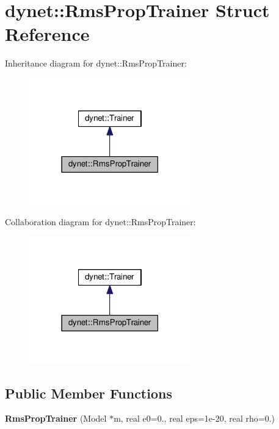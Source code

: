 \hypertarget{structdynet_1_1RmsPropTrainer}{}\section{dynet\+:\+:Rms\+Prop\+Trainer Struct Reference}
\label{structdynet_1_1RmsPropTrainer}


Inheritance diagram for dynet\+:\+:Rms\+Prop\+Trainer\+:\nopagebreak
\begin{figure}[H]
\begin{center}
\leavevmode
\includegraphics[width=198pt]{structdynet_1_1RmsPropTrainer__inherit__graph}
\end{center}
\end{figure}


Collaboration diagram for dynet\+:\+:Rms\+Prop\+Trainer\+:\nopagebreak
\begin{figure}[H]
\begin{center}
\leavevmode
\includegraphics[width=198pt]{structdynet_1_1RmsPropTrainer__coll__graph}
\end{center}
\end{figure}
\subsection*{Public Member Functions}
\begin{DoxyCompactItemize}
\item 
\hypertarget{structdynet_1_1RmsPropTrainer_a80f7706c329f61f0a0f828f9795471e5}{}{\bfseries Rms\+Prop\+Trainer} (Model $\ast$m, real e0=0., real eps=1e-\/20, real rho=0.)\label{structdynet_1_1RmsPropTrainer_a80f7706c329f61f0a0f828f9795471e5}

\end{DoxyCompactItemize}
